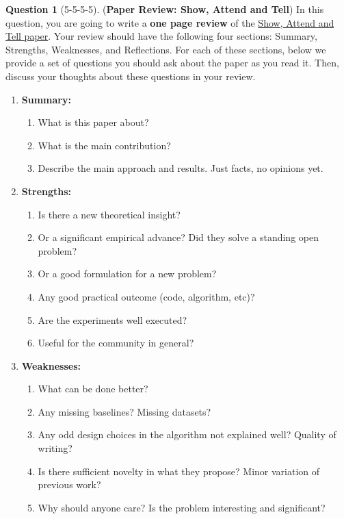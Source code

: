 \documentclass[12pt]{article}
\theoremstyle{definition}
\newtheorem{exercise}{Question}%
\begin{document}
\begin{exercise}[5-5-5-5] (\textbf{Paper Review: Show, Attend and Tell})
    In this question, you are going to write a \textbf{one page review} of the \href{https://arxiv.org/abs/1502.03044}{Show, Attend and Tell paper}. Your review should have the following four sections: Summary, Strengths, Weaknesses, and Reflections. For each of these sections, below we provide a set of questions you should ask about the paper as you read it. Then, discuss your thoughts about these questions in your review.
    \begin{enumerate}[label=(\theexercise.\arabic*)]
        \item \textbf{Summary:}
        \begin{enumerate}
            \item What is this paper about?
            \item What is the main contribution? 
            \item Describe the main approach and results. Just facts, no opinions yet. 
        \end{enumerate}
        \item \textbf{Strengths:}
        \begin{enumerate}
            \item Is there a new theoretical insight?
            \item Or a significant empirical advance? Did they solve a standing open problem? 
            \item Or a good formulation for a new problem? 
            \item Any good practical outcome (code, algorithm, etc)?
            \item Are the experiments well executed? 
            \item Useful for the community in general? 
        \end{enumerate}
        \item \textbf{Weaknesses:}
        \begin{enumerate}
            \item What can be done better?
            \item Any missing baselines? Missing datasets?
            \item Any odd design choices in the algorithm not explained well? Quality of writing?
            \item Is there sufficient novelty in what they propose? Minor variation of previous work? 
            \item Why should anyone care? Is the problem interesting and significant? 

\end{enumerate}
\end{enumerate}
\end{exercise}
\end{document}
